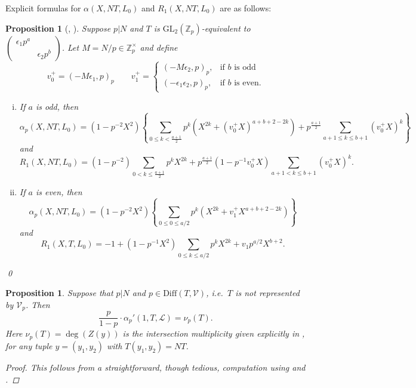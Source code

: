 \documentclass[reqno,oneside]{amsart}
\theoremstyle{plain}
\newtheorem{proposition}[theorem]{Proposition}
\theoremstyle{remark}
\numberwithin{theorem}{section}
\newcommand{\bbZ}{\mathbb Z}
\newcommand{\calL}{\mathcal L}
\newcommand{\calV}{\mathcal V}
\newcommand{\psm}[1]{\left( \begin{smallmatrix}#1 \end{smallmatrix} \right)}
\newcommand{\GL}{\mathrm{GL}}
\begin{document}
	Explicit formulas for $\alpha(X, NT, L_0)$ and $R_1(X, NT, L_0)$ are as follows:
	\begin{proposition}[{\cite{Kitaoka}, \cite[\S 8]{YangLocal}}]   \label{prop:rep dens split}
		Suppose $p|N$ and $T$ is $\GL_2(\bbZ_p)$-equivalent to $\psm{ \epsilon_1 p^{a} & \\ & \epsilon_2 p^b}$. Let $M=N/p \in \bbZ_p^{\times}$ and define
		\begin{equation*}
		v_0^+ = (-M \epsilon_1, p)_p  \qquad
		v_1^+ = \begin{cases}
		(-M \epsilon_2, p)_p, &  \text{if } b \text{ is odd} \\
		(-\epsilon_1 \epsilon_2, p)_p, & \text{if } b \text{ is even}.
		\end{cases}
		\end{equation*}
		\begin{enumerate}[(i)]
			\item If $a$ is odd, then
			$$
			\alpha_p(X, NT, L_0) = (1 - p^{-2}X^2) \left\{ \sum_{0 \leq k < \frac{a+1}{2}}  p^k (X^{2k} + (v_0^+ X)^{a + b+2 - 2k}) + p^{\frac{a+1}{2}} \sum_{a+1 \leq k \leq b+1}(v_0^+ X)^k\right\}
			$$
			and
			\begin{equation*}
			R_1(X, NT, L_0) = (1-p^{-2}) \sum_{0<k\leq\frac{a+1}{2}} p^k X^{2k} + p^{\frac{a+1}{2}} (1- p^{-1} v_0^+ X) \sum_{a+1<k\leq b+1} (v_0^+X)^k.
			\end{equation*}
			\item If $a$ is even, then
			\begin{equation*}
			\alpha_p(X, NT, L_0) = (1-p^{-2}X^2)\left\{ \sum_{0 \leq 0 \leq a/2} p^k(X^{2k} + v_1^+ X^{a+b+2-2k}) \right\}
			\end{equation*}
			and
			\begin{equation*}
			R_1(X,T, L_0) = -1 + (1 - p^{-1}X^2) \sum_{0 \leq k \leq a/2} p^k X^{2k} + v_1 p^{a/2} X^{b+2}.
			\end{equation*}	
		\end{enumerate}
		\qed
	\end{proposition}
	
	
	
	\begin{proposition} \label{prop:whittaker local degree identity bad primes}
		Suppose that  $p|N$ and $p \in \mathrm{Diff}(T, \calV)$, i.e.\ $T$ is not represented by $\calV_p$. Then
		\begin{equation*}
		\frac{p}{1-p} \cdot 	\alpha_p'(1, T, \calL) = \nu_p(T).	
		\end{equation*}
		Here $\nu_p(T) = \deg(Z(y))$ is the intersection multiplicity given explicitly in , for any tuple $y = (y_1, y_2)$ with $T(y_1, y_2) = NT$.
		\begin{proof}
			This follows from a straightforward, though  tedious, computation using  and .
		\end{proof}
	\end{proposition}
	
\end{document}

